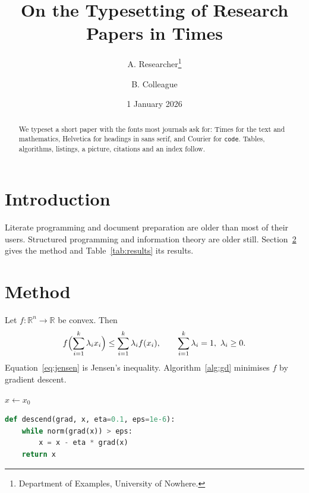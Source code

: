 \documentclass[11pt,a4paper]{article}
\title{On the Typesetting of Research Papers in Times}
\author{A. Researcher\thanks{Department of Examples, University of Nowhere.} \and B. Colleague}
\date{1 January 2026}
\begin{document}
\maketitle
\begin{abstract}
We typeset a short paper with the fonts most journals ask for: Times for
the text and mathematics, Helvetica for headings in \textsf{sans serif},
and Courier for \texttt{code}. Tables, algorithms, listings, a picture,
citations and an index follow.
\end{abstract}

\section{Introduction}\label{sec:intro}
Literate programming \citep{knuth1984} and
document preparation \citep{lamport1994} are
older than most of their users. Structured programming
\citep{dijkstra1968} and information theory \citep{shannon1948,turing1938}
are older still. Section~\ref{sec:method} gives the method and
Table~\ref{tab:results} its results.

\section{Method}\label{sec:method}
Let $f\colon \mathbb{R}^n \to \mathbb{R}$ be convex. Then
\begin{equation}
  f\Bigl(\sum_{i=1}^{k} \lambda_i x_i\Bigr) \le \sum_{i=1}^{k} \lambda_i f(x_i),
  \qquad \sum_{i=1}^k \lambda_i = 1,\ \lambda_i \ge 0 .
  \label{eq:jensen}
\end{equation}
Equation~\eqref{eq:jensen} is Jensen's inequality.
Algorithm~\ref{alg:gd} minimises $f$ by gradient descent.

\begin{algorithm}
\caption{Gradient descent}\label{alg:gd}
$x \gets x_0$\;
\;
\end{algorithm}

\begin{lstlisting}[language=Python,caption={The same in Python}]
def descend(grad, x, eta=0.1, eps=1e-6):
    while norm(grad(x)) > eps:
        x = x - eta * grad(x)
    return x
\end{lstlisting}
\end{document}
